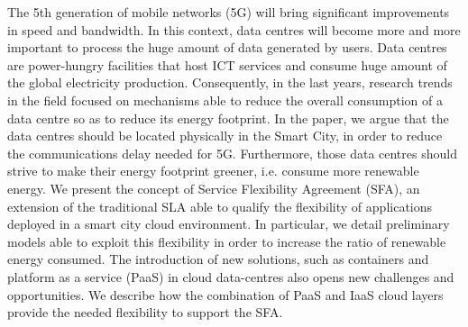 The 5th generation of mobile networks (5G) will bring significant improvements in speed and bandwidth.
In this context, data centres will become more and more important to process the huge amount of data generated by users.
Data centres are power-hungry facilities that host ICT services and consume huge amount of the global electricity production.
Consequently, in the last years, research trends in the field focused on mechanisms able to reduce the overall consumption of a data centre so as to reduce its energy footprint.
In the paper, we argue that the data centres should be located physically in the Smart City, in order to reduce the communications delay needed for 5G.
Furthermore, those data centres should strive to make their energy footprint greener, i.e. consume more renewable energy.
We present the concept of Service Flexibility Agreement (SFA), an extension of the traditional SLA able to qualify the flexibility of applications deployed in a smart city cloud environment.
In particular, we detail preliminary models able to exploit this flexibility in order to increase the ratio of renewable energy consumed.
The introduction of new solutions, such as containers and platform as a service (PaaS) in cloud data-centres also opens new challenges and opportunities.
We describe how the combination of PaaS and IaaS cloud layers provide the needed flexibility to support the SFA.